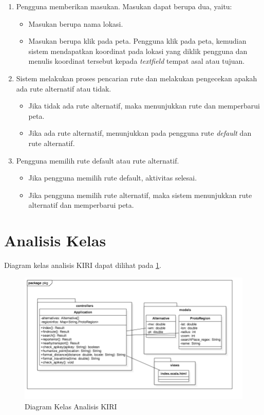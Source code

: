 \begin{enumerate}
	\item Pengguna memberikan masukan. Masukan dapat berupa dua, yaitu:
	\begin{itemize}
		\item Masukan berupa nama lokasi.
		\item Masukan berupa klik pada peta. Pengguna klik pada peta, kemudian sistem mendapatkan koordinat pada lokasi yang diklik pengguna dan menulis koordinat tersebut kepada \textit{textfield} tempat asal atau tujuan.
	\end{itemize}
	\item Sistem melakukan proses pencarian rute dan melakukan pengecekan apakah ada rute alternatif atau tidak.
	\begin{itemize}
		\item Jika tidak ada rute alternatif, maka menunjukkan rute dan memperbarui peta.
		\item Jika ada rute alternatif, menunjukkan pada pengguna rute \textit{default} dan rute alternatif.
	\end{itemize}
	\item Pengguna memilih rute default atau rute alternatif.
	\begin{itemize}
		\item Jika pengguna memilih rute default, aktivitas selesai.
		\item Jika pengguna memilih rute alternatif, maka sistem menunjukkan rute alternatif dan memperbarui peta.
	\end{itemize}
\end{enumerate}


\section{Analisis Kelas}
\label{sec:kelasdiagram}
Diagram kelas analisis KIRI dapat dilihat pada \ref{fig:3_classdiagram}.

\begin{figure}[H]
	\centering
	\includegraphics[scale=0.6]{Gambar/Class-Diagram-Analisis}
	\caption{Diagram Kelas Analisis KIRI} 
	\label{fig:3_classdiagram}
\end{figure}

